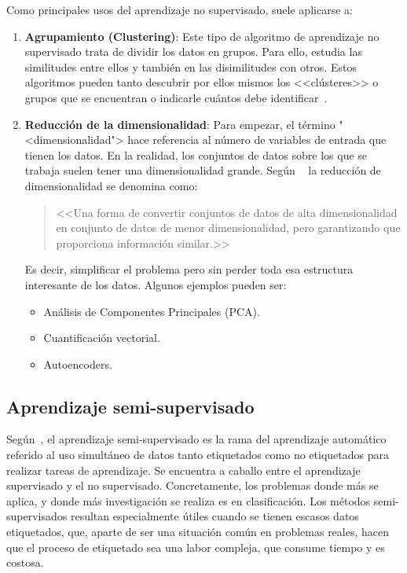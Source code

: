 Como principales usos del aprendizaje no supervisado, suele aplicarse a:
\vspace{-4px}
\begin{enumerate}
    \item \textbf{Agrupamiento (Clustering)}: Este tipo de algoritmo de
    aprendizaje no supervisado trata de dividir los datos en grupos. Para ello,
    estudia las similitudes entre ellos y también en las disimilitudes con
    otros. Estos algoritmos pueden tanto descubrir por ellos mismos los
    <<clústeres>> o grupos que se encuentran o indicarle cuántos debe
    identificar~\cite{salim:usl}.
    \item \textbf{Reducción de la dimensionalidad}: Para empezar, el término
    "<dimensionalidad"> hace referencia al número de variables de entrada que
    tienen los datos. En la realidad, los conjuntos de datos sobre los que se
    trabaja suelen tener una dimensionalidad grande. Según
   ~\cite{javatpoint:reduccionsdims} la reducción de dimensionalidad se denomina
    como: \begin{quote}<<Una forma de convertir conjuntos de datos de alta dimensionalidad en
    conjunto de datos de menor dimensionalidad, pero garantizando que proporciona
    información similar.>>\end{quote} Es decir, simplificar el problema pero sin perder
    toda esa estructura interesante de los datos. Algunos ejemplos pueden ser:
    \begin{itemize}
        \item Análisis de Componentes Principales (PCA).
        \item Cuantificación vectorial.
        \item Autoencoders.
    \end{itemize}
\end{enumerate}

\subsection{Aprendizaje semi-supervisado}

Según~\cite{vanEngelen2020}, el aprendizaje semi-supervisado es la rama del
aprendizaje automático referido al uso simultáneo de datos tanto etiquetados
como no etiquetados para realizar tareas de aprendizaje. Se encuentra a caballo
entre el aprendizaje supervisado y el no supervisado. Concretamente, los
problemas donde más se aplica, y donde más investigación se realiza es en
clasificación. Los métodos semi-supervisados resultan especialmente útiles
cuando se tienen escasos datos etiquetados, que, aparte de ser una situación
común en problemas reales, hacen que el proceso de etiquetado sea una labor
compleja, que consume tiempo y es costosa.

